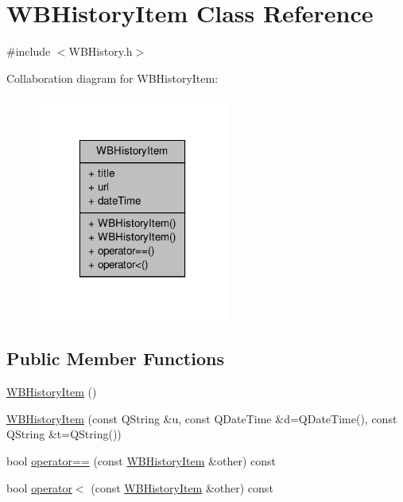 \hypertarget{class_w_b_history_item}{\section{W\-B\-History\-Item Class Reference}
\label{db/d07/class_w_b_history_item}
}


{\ttfamily \#include $<$W\-B\-History.\-h$>$}



Collaboration diagram for W\-B\-History\-Item\-:
\nopagebreak
\begin{figure}[H]
\begin{center}
\leavevmode
\includegraphics[width=178pt]{db/d4f/class_w_b_history_item__coll__graph}
\end{center}
\end{figure}
\subsection*{Public Member Functions}
\begin{DoxyCompactItemize}
\item 
\hyperlink{class_w_b_history_item_a52a8070aa0c8c3d4a69a6d9487684fee}{W\-B\-History\-Item} ()
\item 
\hyperlink{class_w_b_history_item_a01c49345dbb24e071ea8d9883235c6d7}{W\-B\-History\-Item} (const Q\-String \&u, const Q\-Date\-Time \&d=Q\-Date\-Time(), const Q\-String \&t=Q\-String())
\item 
bool \hyperlink{class_w_b_history_item_a13997c6f2a247a8d2d20bbeb248b3d5e}{operator==} (const \hyperlink{class_w_b_history_item}{W\-B\-History\-Item} \&other) const 
\item 
bool \hyperlink{class_w_b_history_item_a178931044aa7fd02ccd8d9534d3e5a43}{operator$<$} (const \hyperlink{class_w_b_history_item}{W\-B\-History\-Item} \&other) const 
\end{DoxyCompactItemize}
